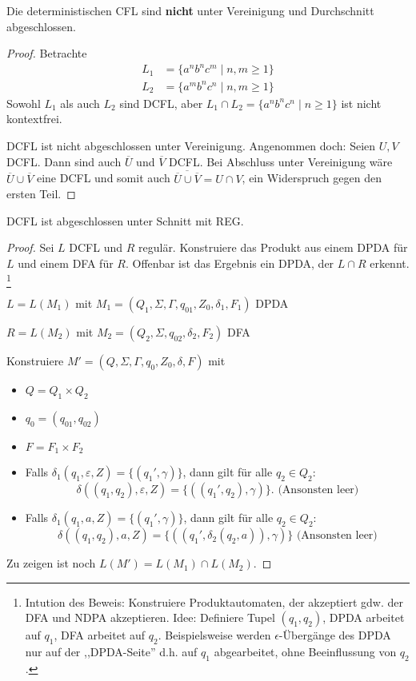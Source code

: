 \begin{Satz}
    Die deterministischen \ac{CFL} sind \textbf{nicht} unter Vereinigung und Durchschnitt abgeschlossen.
\end{Satz}
\begin{proof}
    Betrachte
    \begin{align*}
        L_1 &= \{ a^nb^nc^m \mid n, m \ge 1 \} \\
        L_2 &= \{ a^mb^nc^n \mid n, m \ge 1 \}
    \end{align*}
    Sowohl $L_1$ als auch $L_2$ sind DCFL, aber $L_1 \cap L_2 = \{ a^nb^nc^n \mid n \ge 1\}$ ist nicht kontextfrei.
    
    DCFL ist nicht abgeschlossen unter Vereinigung. Angenommen doch: Seien $U, V$ DCFL. Dann sind auch $\overline{U}$ und $\overline{V}$ DCFL. Bei Abschluss unter Vereinigung wäre $\overline{U} \cup \overline{V}$ eine DCFL und somit auch $\overline{\overline{U} \cup \overline{V}} = U \cap V$, ein Widerspruch gegen den ersten Teil.
\end{proof}
\begin{Satz}
    DCFL ist abgeschlossen unter Schnitt mit REG.
\end{Satz}
\begin{proof}
    Sei $L$ DCFL und $R$ regulär.
    Konstruiere das Produkt aus einem DPDA für $L$ und einem DFA für $R$.
    Offenbar ist das Ergebnis ein DPDA, der $L\cap R$ erkennt. \footnote{
    Intution des Beweis: Konstruiere Produktautomaten, der akzeptiert gdw. der DFA und NDPA akzeptieren. Idee: Definiere Tupel $(q_1, q_2)$, DPDA arbeitet auf $q_1$, DFA arbeitet auf $q_2$. Beispielsweise werden $\epsilon$-Übergänge des DPDA nur auf der ,,DPDA-Seite'' d.h. auf $q_1$ abgearbeitet, ohne Beeinflussung von $q_2$.
    }

    $L = L (M_1)$ mit $M_1 = (Q_1, \Sigma, \Gamma, q_{01}, Z_0,
    \delta_1, F_1)$ \ac{DPDA}

    $R = L (M_2)$ mit $M_2 = (Q_2, \Sigma, q_{02}, \delta_2, F_2)$
    \ac{DFA}

    Konstruiere $M'= (Q, \Sigma, \Gamma, q_0, Z_0, \delta, F)$ mit
    \begin{itemize}
    \item $Q = Q_1 \times Q_2$
    \item $q_0 = (q_{01}, q_{02})$
    \item $F = F_1  \times F_2$
    \item Falls $\delta_1 (q_1, \varepsilon, Z) = \{(q_1', \gamma)\}$, dann gilt für alle $q_2\in Q_2$: 
      \[ \delta ((q_1, q_2), \varepsilon, Z)
      = \{((q_1', q_2), \gamma)\} \text{.     (Ansonsten leer)} \]
    \item Falls $\delta_1 (q_1, a, Z) = \{(q_1', \gamma)\}$, dann gilt für alle $q_2\in Q_2$: 
      \[ \delta ((q_1, q_2), a, Z) =
      \{((q_1', \delta_2 (q_2, a)), \gamma)\} \text{   (Ansonsten leer)} \]
    \end{itemize}
    Zu zeigen ist noch $L (M') = L (M_1) \cap L (M_2)$.
\end{proof}
